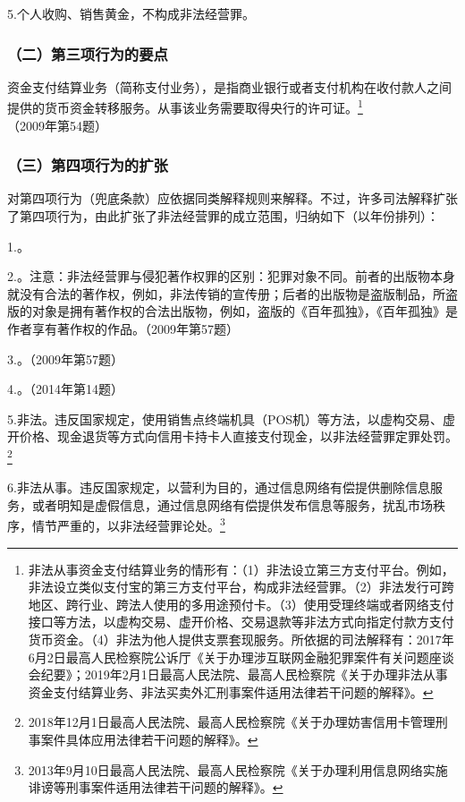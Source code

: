 5.个人收购、销售黄金，不构成非法经营罪。

\subsubsection*{（二）第三项行为的要点}

资金支付结算业务（简称支付业务），是指商业银行或者支付机构在收付款人之间提供的货币资金转移服务。从事该业务需要取得央行的许可证。\footnote{非法从事资金支付结算业务的情形有：（1）非法设立第三方支付平台。例如，非法设立类似支付宝的第三方支付平台，构成非法经营罪。（2）非法发行可跨地区、跨行业、跨法人使用的多用途预付卡。（3）使用受理终端或者网络支付接口等方法，以虚构交易、虚开价格、交易退款等非法方式向指定付款方支付货币资金。（4）非法为他人提供支票套现服务。所依据的司法解释有：2017年6月2日最高人民检察院公诉厅《关于办理涉互联网金融犯罪案件有关问题座谈会纪要》；2019年2月1日最高人民法院、最高人民检察院《关于办理非法从事资金支付结算业务、非法买卖外汇刑事案件适用法律若干问题的解释》。}（2009年第54题）

\subsubsection*{（三）第四项行为的扩张}

对第四项行为（兜底条款）应依据同类解释规则来解释。不过，许多司法解释扩张了第四项行为，由此扩张了非法经营罪的成立范围，归纳如下（以年份排列）：

1.。

2.。注意：非法经营罪与侵犯著作权罪的区别：犯罪对象不同。前者的出版物本身就没有合法的著作权，例如，非法传销的宣传册；后者的出版物是盗版制品，所盗版的对象是拥有著作权的合法出版物，例如，盗版的《百年孤独》，《百年孤独》是作者享有著作权的作品。（2009年第57题）

3.。（2009年第57题）

4.。（2014年第14题）

5.非法。违反国家规定，使用销售点终端机具（POS机）等方法，以虚构交易、虚开价格、现金退货等方式向信用卡持卡人直接支付现金，以非法经营罪定罪处罚。\footnote{2018年12月1日最高人民法院、最高人民检察院《关于办理妨害信用卡管理刑事案件具体应用法律若干问题的解释》。}

6.非法从事。违反国家规定，以营利为目的，通过信息网络有偿提供删除信息服务，或者明知是虚假信息，通过信息网络有偿提供发布信息等服务，扰乱市场秩序，情节严重的，以非法经营罪论处。\footnote{2013年9月10日最高人民法院、最高人民检察院《关于办理利用信息网络实施诽谤等刑事案件适用法律若干问题的解释》。}

